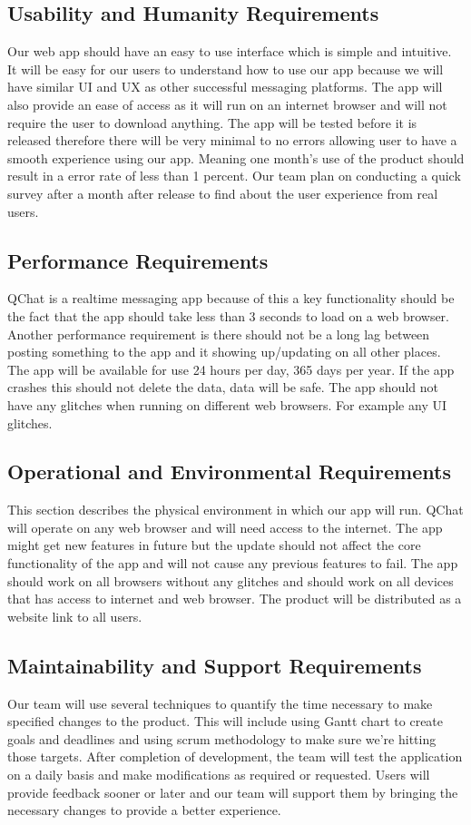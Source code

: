 \documentclass[12pt, titlepage]{article}
\begin{document}
\subsection{Usability and Humanity Requirements}
Our web app should have an easy to use interface which is simple and intuitive. It will be easy for our users to understand how to use our app because we will have similar UI and UX as other successful messaging platforms. The app will also provide an ease of access as it will run on an internet browser and will not require the user to download anything. The app will be tested before it is released therefore there will be very minimal to no errors allowing user to have a smooth experience using our app. Meaning one month’s use of the product should result in a error rate of less than 1 percent. 
Our team plan on conducting a quick survey after a month after release to find about the user experience from real users. 


\subsection{Performance Requirements}
QChat is a realtime messaging app because of this a key functionality should be the fact that the app should take less than 3 seconds to load on a web browser. Another performance requirement is there should not be a long lag between posting something to the app and it showing up/updating on all other places. The app will be available for use 24 hours per day, 365 days per year. If the app crashes this should not delete the data, data will be safe. The app should not have any glitches when running on different web browsers. For example any UI glitches. 

\subsection{Operational and Environmental Requirements}
This section describes the physical environment in which our app will run. QChat will operate on any web browser and will need access to the internet. The app might get new features in future but the update should not affect the core functionality of the app and will not cause any previous features to fail. The app should work on all browsers without any glitches and should work on all devices that has access to internet and web browser. The product will be distributed as a website link to all users. 

\subsection{Maintainability and Support Requirements}
Our team will use several techniques to quantify the time necessary to make specified changes to the product. This will include using Gantt chart to create goals and deadlines and using scrum methodology to make sure we’re hitting those targets. After completion of development, the team will test the application on a daily basis and make modifications as required or requested. Users will provide feedback sooner or later and our team will support them by bringing the necessary changes to provide a better experience. 
\end{document}
